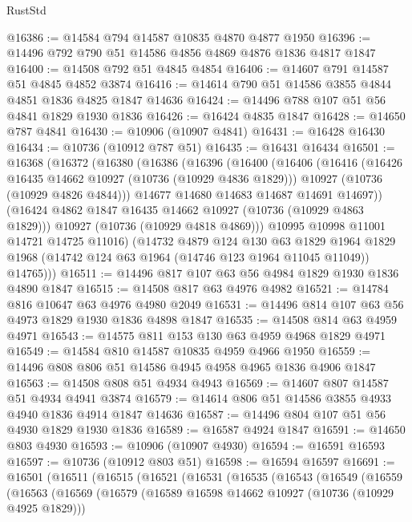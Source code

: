\begin{lexlean}{RustStd}
\begin{coremodule}
@16386 := @14584 @794 @14587 @10835 @4870 @4877 @1950
@16396 := @14496 @792 @790 @51 @14586 @4856 @4869 @4876 @1836 @4817 @1847
@16400 := @14508 @792 @51 @4845 @4854
@16406 := @14607 @791 @14587 @51 @4845 @4852 @3874
@16416 := @14614 @790 @51 @14586 @3855 @4844 @4851 @1836 @4825 @1847 @14636
@16424 := @14496 @788 @107 @51 @56 @4841 @1829 @1930 @1836
@16426 := @16424 @4835 @1847
@16428 := @14650 @787 @4841
@16430 := @10906 (@10907 @4841)
@16431 := @16428 @16430
@16434 := @10736 (@10912 @787 @51)
@16435 := @16431 @16434
@16501 := @16368
    (@16372
      (@16380
        (@16386
          (@16396
            (@16400
              (@16406
                (@16416
                  (@16426 @16435 @14662 @10927 (@10736 (@10929 @4836 @1829)))
                  @10927
                  (@10736 (@10929 @4826 @4844)))
                @14677
                @14680
                @14683
                @14687
                @14691
                @14697))
            (@16424 @4862 @1847 @16435 @14662 @10927 (@10736 (@10929 @4863 @1829)))
            @10927
            (@10736 (@10929 @4818 @4869)))
          @10995
          @10998
          @11001
          @14721
          @14725
          @11016)
        (@14732
          @4879
          @124
          @130
          @63
          @1829
          @1964
          @1829
          @1968
          (@14742 @124 @63 @1964 (@14746 @123 @1964 @11045 @11049))
          @14765)))
@16511 := @14496 @817 @107 @63 @56 @4984 @1829 @1930 @1836 @4890 @1847
@16515 := @14508 @817 @63 @4976 @4982
@16521 := @14784 @816 @10647 @63 @4976 @4980 @2049
@16531 := @14496 @814 @107 @63 @56 @4973 @1829 @1930 @1836 @4898 @1847
@16535 := @14508 @814 @63 @4959 @4971
@16543 := @14575 @811 @153 @130 @63 @4959 @4968 @1829 @4971
@16549 := @14584 @810 @14587 @10835 @4959 @4966 @1950
@16559 := @14496 @808 @806 @51 @14586 @4945 @4958 @4965 @1836 @4906 @1847
@16563 := @14508 @808 @51 @4934 @4943
@16569 := @14607 @807 @14587 @51 @4934 @4941 @3874
@16579 := @14614 @806 @51 @14586 @3855 @4933 @4940 @1836 @4914 @1847 @14636
@16587 := @14496 @804 @107 @51 @56 @4930 @1829 @1930 @1836
@16589 := @16587 @4924 @1847
@16591 := @14650 @803 @4930
@16593 := @10906 (@10907 @4930)
@16594 := @16591 @16593
@16597 := @10736 (@10912 @803 @51)
@16598 := @16594 @16597
@16691 := @16501
    (@16511
      (@16515
        (@16521
          (@16531
            (@16535
              (@16543
                (@16549
                  (@16559
                    (@16563
                      (@16569
                        (@16579
                          (@16589 @16598 @14662 @10927 (@10736 (@10929 @4925 @1829)))

\end{coremodule}
\end{lexlean}
